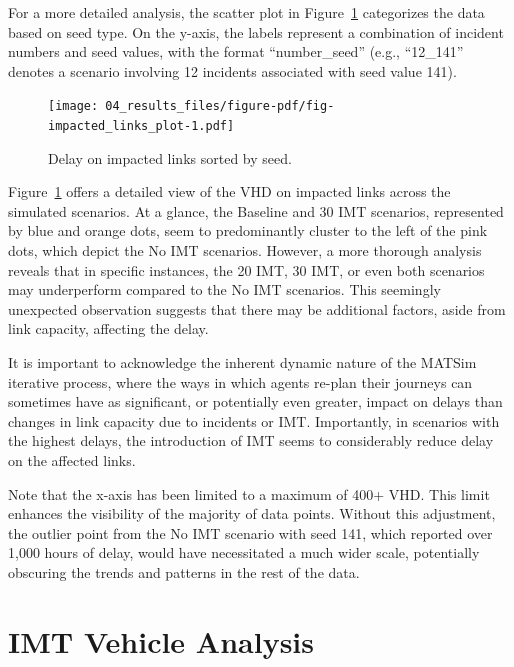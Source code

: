 \documentclass[fancy, oneside, mastersfancy, ms]{byuthesis}
\begin{document}
For a more detailed analysis, the scatter plot in
Figure~\ref{fig-impacted_links_plot} categorizes the data based on seed
type. On the y-axis, the labels represent a combination of incident
numbers and seed values, with the format ``number\_seed'' (e.g.,
``12\_141'' denotes a scenario involving 12 incidents associated with
seed value 141).

\begin{figure}

{\centering \texttt{[image: 04\_results\_files/figure-pdf/fig-impacted\_links\_plot-1.pdf]}

}

\caption{\label{fig-impacted_links_plot}Delay on impacted links sorted
by seed.}

\end{figure}

Figure~\ref{fig-impacted_links_plot} offers a detailed view of the VHD
on impacted links across the simulated scenarios. At a glance, the
Baseline and 30 IMT scenarios, represented by blue and orange dots, seem
to predominantly cluster to the left of the pink dots, which depict the
No IMT scenarios. However, a more thorough analysis reveals that in
specific instances, the 20 IMT, 30 IMT, or even both scenarios may
underperform compared to the No IMT scenarios. This seemingly unexpected
observation suggests that there may be additional factors, aside from
link capacity, affecting the delay.

It is important to acknowledge the inherent dynamic nature of the MATSim
iterative process, where the ways in which agents re-plan their journeys
can sometimes have as significant, or potentially even greater, impact
on delays than changes in link capacity due to incidents or IMT.
Importantly, in scenarios with the highest delays, the introduction of
IMT seems to considerably reduce delay on the affected links.

Note that the x-axis has been limited to a maximum of 400+ VHD. This
limit enhances the visibility of the majority of data points. Without
this adjustment, the outlier point from the No IMT scenario with seed
141, which reported over 1,000 hours of delay, would have necessitated a
much wider scale, potentially obscuring the trends and patterns in the
rest of the data.

\hypertarget{imt-vehicle-analysis}{%
\section{IMT Vehicle Analysis}\label{imt-vehicle-analysis}}
\end{document}
